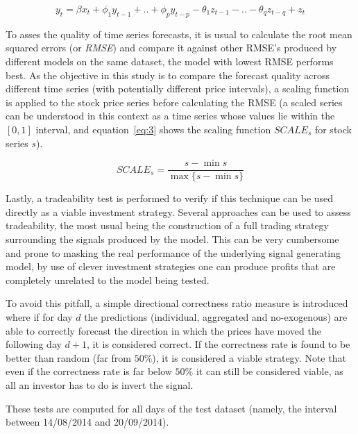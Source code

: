 \documentclass[conference,11pt]{IEEEtran}
\begin{document}
\begin{equation}
\label{eq:5}
y_t=\beta x_t + \phi_1 y_{t-1} + .. + \phi_p y_{t-p} - 
\theta_1 z_{t-1} - .. - \theta_q z_{t-q} +
z_t
\end{equation}

\par
To asses the quality of time series forecasts, it is usual to calculate the root mean squared errors (or \textit{RMSE}) and compare it against other RMSE's produced by different models on the same dataset, the model with lowest RMSE performs best. As the objective in this study is to compare the forecast quality across different time series (with potentially different price intervals), a scaling function is applied to the stock price series before calculating the RMSE (a scaled series can be understood in this context as a time series whose values lie within the \([0,1]\) interval, and equation~\ref{eq:3} shows the scaling function \(SCALE_{s}\) for stock series \(s\)).

\begin{equation}
\label{eq:3}
SCALE_{s}=\frac{s-\min s}{\max \{s-\min s\}}
\end{equation}

\par
Lastly, a tradeability test is performed to verify if this technique can be used directly as a viable investment strategy. Several approaches can be used to assess tradeability, the most usual being the construction of a full trading strategy surrounding the signals produced by the model. This can be very cumbersome and prone to masking the real performance of the underlying signal generating model, by use of clever investment strategies one can produce profits that are completely unrelated to the model being tested.

\par
To avoid this pitfall, a simple directional correctness ratio measure is introduced where if for day \(d\) the predictions (individual, aggregated and no-exogenous) are able to correctly forecast the direction in which the prices have moved the following day \(d+1\), it is considered correct. If the correctness rate is found to be better than random (far from \(50\%\)), it is considered a viable strategy. Note that even if the correctness rate is far below \(50\%\) it can still be considered viable, as all an investor has to do is invert the signal.

\par
These tests are computed for all days of the test dataset (namely, the interval between 14/08/2014 and 20/09/2014).
\end{document}
